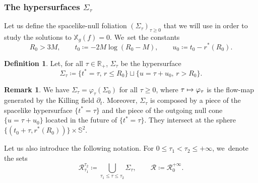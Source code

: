 \documentclass[JEP,XML,SOM,Unicode,published]{cedram}
\newcommand\mto{\mathchoice{\longmapsto}{\mapsto}{\mapsto}{\mapsto}}
\theoremstyle{plain}
\theoremstyle{definition}
\newtheorem{definition}[proposition]{Definition}
\newtheorem{remark}[proposition]{Remark}
\newcommand\R{{\mathbb{R}}}
\newcommand\T{{\mathbb{X}}}
\begin{document}
\subsubsection{The hypersurfaces $\Sigma_\tau$}\label{Subsubsecvolume}

Let us define the spacelike-null foliation $(\Sigma_\tau)_{\tau \geq 0}$ that we will use in order to study the solutions to $\T_g (f)=0$. We~set the constants
\[
R_0>3M, \qquad t_0 \coloneqq -2M \log (R_0-M), \qquad u_0\coloneqq t_0-r^*(R_0).
\]

\begin{definition}
Let, for all $\tau\in \R_+$, $\Sigma_\tau$ be the hypersurface
\[
\Sigma_\tau \coloneqq \{ t^* = \tau, \, r \leq R_0 \} \sqcup \{ u=\tau+u_0, \, r > R_0 \}.
\]
\end{definition}
\begin{remark}
We have $\Sigma_\tau=\varphi_{\tau}(\Sigma_0)$ for all $\tau\geq 0$, where $\tau \mto \varphi_\tau$ is the flow-map generated by the Killing field $\partial_t$. Moreover, $\Sigma_\tau$ is composed by a piece of the spacelike hypersurface $\{ t^* = \tau \}$ and the piece of the outgoing null cone $\{u = \tau +u_0 \}$ located in the future of $\{t^* = \tau \}$. They intersect at the sphere $\{(t_0+\tau,r^*(R_0))\}\times \mathbb{S}^2$.
\end{remark}

Let us also introduce the following notation. For $0\leq \tau_1<\tau_2\leq +\infty$, we~denote the sets
\[
\mathcal{R}^{\tau_2}_{\tau_1} \coloneqq \bigcup_{\tau_1\leq\tau\leq \tau_2} \Sigma_\tau,\qquad \mathcal{R} \coloneqq \mathcal{R}^{+\infty}_0.
\]
\end{document}
